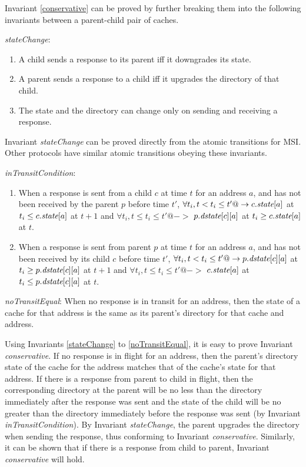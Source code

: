 Invariant \ref{conservative} can be proved by
further breaking them into the following invariants between a parent-child pair
of caches.

\begin{inv}
\textit{stateChange}:
\begin{enumerate}
\item A child sends a response to its parent iff it downgrades its state.
\item A parent sends a response to a child iff it upgrades the directory of
that child.
\item The state and the directory can change only on sending and receiving a
response.
\end{enumerate}
\label{stateChange}
\end{inv}

Invariant \textit{stateChange} can be proved directly from the atomic
transitions for MSI. Other protocols have similar atomic transitions obeying
these invariants.

\begin{inv}
\textit{inTransitCondition}:
\begin{enumerate}
\item When a response is sent from a child $c$ at time $t$ for an address $a$,
and has not been received by the parent $p$ before time $t'$, $\forall t_i, t <
t_i \le t' @-> c.\textit{state}[a]$ at $t_i \le c.\textit{state}[a]$ at $t+1$ and $\forall t_i,
t \le t_i \le t' @->$ $p.\textit{dstate}[c][a]$ at $t_i \ge c.\textit{state}[a]$ at $t$.
\item When a response is sent from parent $p$ at time $t$ for an address $a$,
and has not been received by its child $c$ before time $t'$, $\forall t_i, t <
t_i \le t' @-> p.\textit{dstate}[c][a]$ at $t_i \ge p.\textit{dstate}[c][a]$ at $t+1$ and
$\forall t_i, t \le t_i \le t' @->$ $c.\textit{state}[a]$ at $t_i \le p.\textit{dstate}[c][a]$ at
$t$.
\end{enumerate}
\label{inTransitCondition}
\end{inv}

\begin{inv}
\textit{noTransitEqual}: When no response is in transit for an address, then
the state of a cache for that address is the same as its parent's directory for
that cache and address.
\label{noTransitEqual}
\end{inv}

Using Invariants \ref{stateChange} to \ref{noTransitEqual}, it is easy to prove
Invariant \textit{conservative}. If no response is in flight for an address, then
the parent's directory state of the cache for the address matches that of the
cache's state for that address. If there is a response from parent to child in
flight, then the corresponding directory at the parent will be no less than the
directory immediately after the response was sent and the state of the child
will be no greater than the directory immediately before the response was sent
(by Invariant \textit{inTransitCondition}). By Invariant \textit{stateChange}, the
parent upgrades the directory when sending the response, thus conforming to
Invariant \textit{conservative}. Similarly, it can be shown that if there is a
response from child to parent, Invariant \textit{conservative} will hold.

